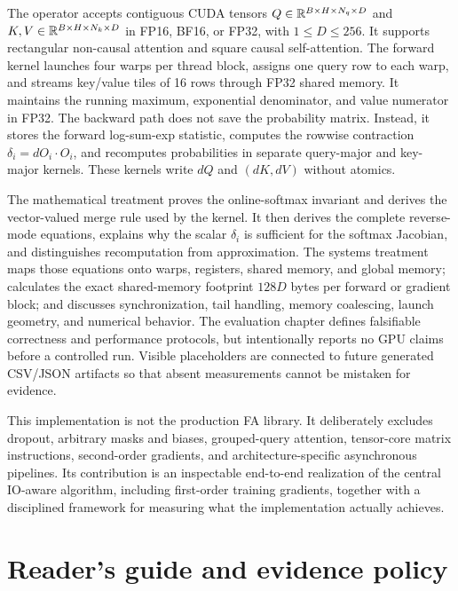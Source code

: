 The operator accepts contiguous CUDA tensors $Q\in\mathbb{R}^{B\times H\times N_q\times D}$ and $K,V\in\mathbb{R}^{B\times H\times N_k\times D}$ in FP16, BF16, or FP32, with $1\leq D\leq256$. It supports rectangular non-causal attention and square causal self-attention. The forward kernel launches four warps per thread block, assigns one query row to each warp, and streams key/value tiles of 16 rows through FP32 shared memory. It maintains the running maximum, exponential denominator, and value numerator in FP32. The backward path does not save the probability matrix. Instead, it stores the forward log-sum-exp statistic, computes the rowwise contraction $\delta_i=dO_i\cdot O_i$, and recomputes probabilities in separate query-major and key-major kernels. These kernels write $dQ$ and $(dK,dV)$ without atomics.

The mathematical treatment proves the online-softmax invariant and derives the vector-valued merge rule used by the kernel. It then derives the complete reverse-mode equations, explains why the scalar $\delta_i$ is sufficient for the softmax Jacobian, and distinguishes recomputation from approximation. The systems treatment maps those equations onto warps, registers, shared memory, and global memory; calculates the exact shared-memory footprint $128D$ bytes per forward or gradient block; and discusses synchronization, tail handling, memory coalescing, launch geometry, and numerical behavior. The evaluation chapter defines falsifiable correctness and performance protocols, but intentionally reports no GPU claims before a controlled run. Visible placeholders are connected to future generated CSV/JSON artifacts so that absent measurements cannot be mistaken for evidence.

This implementation is not the production FA{} library. It deliberately excludes dropout, arbitrary masks and biases, grouped-query attention, tensor-core matrix instructions, second-order gradients, and architecture-specific asynchronous pipelines. Its contribution is an inspectable end-to-end realization of the central IO-aware algorithm, including first-order training gradients, together with a disciplined framework for measuring what the implementation actually achieves.

\chapter*{Reader's guide and evidence policy}

